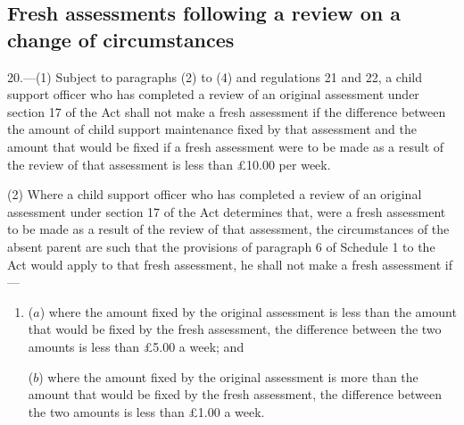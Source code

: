 \documentclass[a4paper]{article}
\begin{document}
\subsection[20. Fresh assessments following a review on a change of circumstances]{Fresh assessments following a review on a change of circumstances}

20.—(1) Subject to 
paragraphs (2) to (4) %
and regulations 21 and 22, a child support officer who has completed a review 
of an original assessment  %
under section 17 of the Act shall not make a fresh assessment if the difference between the amount of child support maintenance 
fixed by that assessment  %
and the amount that would be fixed if a fresh assessment were to be made as a result of the review 
of that assessment  %
is less than £10.00 per week.

(2) Where a child support officer who has completed a review 
of an original assessment  %
under section 17 of the Act determines that, were a fresh assessment to be made as a result of the review
of that assessment, %
the circumstances of the absent parent are such that the provisions of paragraph 6 of Schedule 1 to the Act would apply to that 
fresh  %
assessment, 
he shall not make a fresh assessment if—
\begin{enumerate}\item[]
($a$) where the amount fixed by the original assessment is less than the amount that would be fixed by the fresh assessment, the difference between the two amounts is less than £5.00 a week; and

($b$) where the amount fixed by the original assessment is more than the amount that would be fixed by the fresh assessment, the difference between the two amounts is less than £1.00 a week.
\end{enumerate} %
\end{document}
